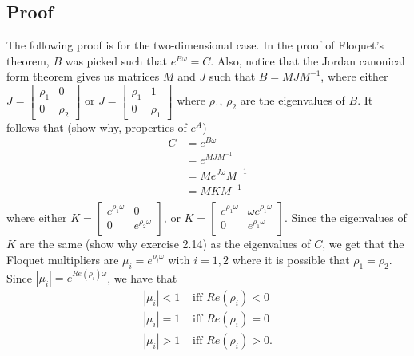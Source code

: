 \documentclass[a4paper]{article}
\begin{document}
\subsection{Proof}
The following proof is for the two-dimensional case. In the proof of Floquet's theorem, $B$ was picked such that $e^{B \omega} = C$. 
Also, notice that the Jordan canonical form theorem gives us matrices $M$ and $J$ such that $B = MJM^{-1}$, where either $J = \begin{bmatrix}
    \rho_1 & 0 \\
    0 & \rho_2
\end{bmatrix}$ or $J = \begin{bmatrix}
    \rho_1 & 1 \\
    0 & \rho_1
\end{bmatrix}$ where $\rho_1$, $\rho_2$ are the eigenvalues of $B$. It follows that (show why, properties of $e^A$)
\begin{equation*}
\begin{split}
    C &= e^{B\omega}\\
      &= e^{MJM^{-1}}\\
      &= M e^{J\omega} M^{-1}\\
      &= M K M^{-1}\\
\end{split}
\end{equation*}
where either $K = \begin{bmatrix}
    e^{\rho_{1}\omega} & 0 \\
    0 & e^{\rho_{2}\omega}\\
\end{bmatrix}$, or $K = \begin{bmatrix}
    e^{\rho_{1}\omega} & \omega e^{\rho_{1}\omega}\\
    0 & e^{\rho_{1}\omega}\\
\end{bmatrix}$.
Since the eigenvalues of $K$ are the same (show why exercise 2.14) as the eigenvalues of $C$, we get that the Floquet multipliers are $\mu_i = e^{\rho_{i}\omega}$ with $i = 1,2$ where it is possible that $\rho_1 = \rho_2$. Since $|\mu_i| = e^{Re(\rho_i)\omega}$, we have that
\begin{equation*}
\begin{split}
    |\mu_i| < 1 &\text{ iff } Re(\rho_i) < 0 \\
    |\mu_i| = 1 &\text{ iff } Re(\rho_i) = 0 \\
    |\mu_i| > 1 &\text{ iff } Re(\rho_i) > 0\text{.} \\
\end{split}
\end{equation*}
\end{document}
